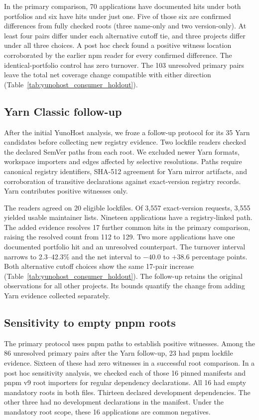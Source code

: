 

In the primary comparison, 70 applications have documented hits under both portfolios and six have hits under just one. Five of those six are confirmed differences from fully checked roots (three name-only and two version-only). At least four pairs differ under each alternative cutoff tie, and three projects differ under all three choices. A post hoc check found a positive witness location corroborated by the earlier npm reader for every confirmed difference. The identical-portfolio control has zero turnover. The 103 unresolved primary pairs leave the total net coverage change compatible with either direction (Table~\ref{tab:yunohost_consumer_holdout}).

\subsection{Yarn Classic follow-up}
After the initial YunoHost analysis, we froze a follow-up protocol for its 35 Yarn candidates before collecting new registry evidence. Two lockfile readers checked the declared SemVer paths from each root. We excluded newer Yarn formats, workspace importers and edges affected by selective resolutions. Paths require canonical registry identifiers, SHA-512 agreement for Yarn mirror artifacts, and corroboration of transitive declarations against exact-version registry records. Yarn contributes positive witnesses only.

The readers agreed on 20 eligible lockfiles. Of 3,557 exact-version requests, 3,555 yielded usable maintainer lists. Nineteen applications have a registry-linked path. The added evidence resolves 17 further common hits in the primary comparison, raising the resolved count from 112 to 129. Two more applications have one documented portfolio hit and an unresolved counterpart. The turnover interval narrows to 2.3--42.3\% and the net interval to $-40.0$ to $+38.6$ percentage points. Both alternative cutoff choices show the same 17-pair increase (Table~\ref{tab:yunohost_consumer_holdout}). The follow-up retains the original observations for all other projects. Its bounds quantify the change from adding Yarn evidence collected separately.

\subsection{Sensitivity to empty pnpm roots}
The primary protocol uses pnpm paths to establish positive witnesses.
Among the 86 unresolved primary pairs after the Yarn follow-up, 23 had pnpm lockfile evidence. Sixteen of these had zero witnesses in a successful root comparison.
In a post hoc sensitivity analysis, we checked each of those 16 pinned
manifests and pnpm v9 root importers for regular dependency declarations.
All 16 had empty mandatory roots in both files. Thirteen declared
development dependencies. The other three had no development
declarations in the manifest. Under the mandatory root scope, these 16
applications are common negatives.

